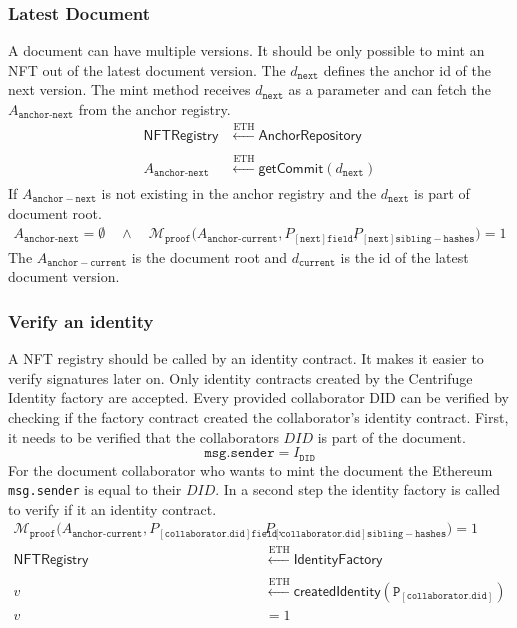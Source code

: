 \subsubsection{Latest Document}
A document can have multiple versions. It should be only possible to mint an NFT out of the latest document version. The $d_{\mathtt{next}}$ defines the anchor id of the next version. The mint method receives $d_{\mathtt{next}}$ as a parameter and can fetch the $A_{\texttt{anchor-next}}$ from the anchor registry.
\begin{equation}
\begin{split}
\mathsf{NFTRegistry} &\xleftarrow[]{\text{ETH}}  \mathsf{AnchorRepository} \\
A_{\texttt{anchor-next}} &\xleftarrow[]{\text{ETH}} \textsf{getCommit}(d_{\mathtt{next}})
\end{split}
\end{equation}
If $A_{\mathtt{anchor-next}}$ is not existing in the anchor registry and the $d_{\mathtt{next}}$ is part of document root.
\begin{equation}
\begin{split}
A_{\texttt{anchor-next}}  = \emptyset \quad \land \quad
\mathcal{M}_{\texttt{proof}}(A_{\texttt{anchor-current}} ,P_{[\mathtt{next}]\mathtt{field}}, &P_{[\mathtt{next}]\mathtt{sibling-hashes}})  = 1
\end{split}
\end{equation}
The $A_{\mathtt{anchor-current}}$ is the document root and $d_\mathtt{current}$ is the id of the latest document version.
\subsubsection{Verify an identity}
A NFT registry should be called by an identity contract. It makes it easier to verify signatures later on. Only identity contracts created by the Centrifuge Identity factory are accepted. Every provided collaborator DID can be verified by checking if the factory contract created the collaborator's identity contract. First, it needs to be verified that the collaborators $DID$ is part of the document.
\begin{equation}
\mathtt{msg.sender} = I_{\mathtt{DID}}
\end{equation}
For the document collaborator who wants to mint the document the Ethereum \texttt{msg.sender} is equal to their $DID$. In a second step the identity factory is called to verify if it an identity contract.
\begin{equation}
\begin{split}
\mathcal{M}_{\texttt{proof}}(A_{\texttt{anchor-current}} ,P_{[\mathtt{collaborator.did}]\mathtt{field}}, &P_{[\mathtt{collaborator.did}]\mathtt{sibling-hashes}})  = 1 \\
\mathsf{NFTRegistry} &\xleftarrow[]{\text{ETH}}  \mathsf{IdentityFactory} \\
v &\xleftarrow[]{\text{ETH}} \textsf{createdIdentity}(\mathtt{P_{[\mathtt{collaborator.did}]}}) \\
v & = 1 \\
\end{split}
\end{equation}

